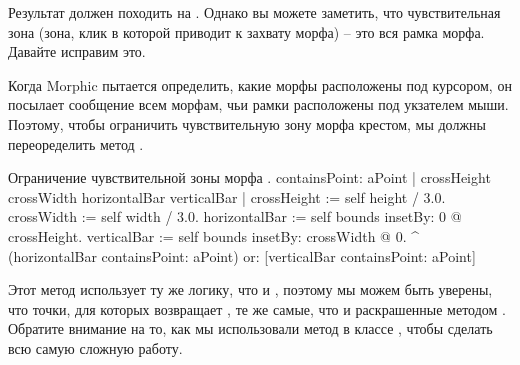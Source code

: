 \documentclass[a4paper,10pt,twoside]{book}
\begin{document}
Результат должен походить на .
Однако вы можете заметить, что чувствительная зона (зона, клик в которой приводит к захвату морфа) -- это вся рамка морфа. Давайте исправим это.

Когда Morphic пытается определить, какие морфы расположены под курсором, он посылает сообщение  всем морфам, чьи рамки расположены под укзателем мыши.
Поэтому, чтобы ограничить чувствительную зону морфа крестом, мы должны переоределить метод .




\begin{method}[firstContains]{Ограничение чувствительной зоны морфа .}
containsPoint: aPoint
	| crossHeight crossWidth horizontalBar verticalBar |
	crossHeight := self height / 3.0.
	crossWidth := self width / 3.0.
	horizontalBar := self bounds insetBy: 0 @ crossHeight.
	verticalBar := self bounds insetBy: crossWidth @ 0.
	^ (horizontalBar containsPoint: aPoint)
		or: [verticalBar containsPoint: aPoint]
\end{method}

Этот метод использует ту же логику, что и , поэтому мы можем быть уверены, что точки, для которых  возвращает , те же самые, что и раскрашенные методом . 
Обратите внимание на то, как мы использовали метод  в классе , чтобы сделать всю самую сложную работу.
\end{document}

